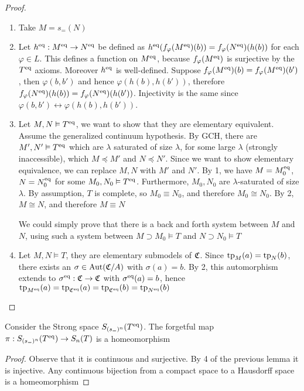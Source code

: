 \documentclass[11pt]{article}
\begin{document}
\begin{proof}
\begin{enumerate}
\item Take \(M=s_=(N)\)
\item Let \(h^{\operatorname{eq}}:M^{\operatorname{eq}}\to N^{\operatorname{eq}}\) be defined
as \(h^{\operatorname{eq}}(f_\varphi(M^{\operatorname{eq}})(b))=f_\varphi(N^{\operatorname{eq}})(h(b))\) for each \(\varphi\in L\). This defines a function
on \(M^{\operatorname{eq}}\), because \(f_\varphi(M^{\operatorname{eq}})\) is surjective by the \(T^{\operatorname{eq}}\) axioms.
Moreover \(h^{\operatorname{eq}}\) is well-defined. Suppose \(f_\varphi(M^{\operatorname{eq}})(b)=f_\varphi(M^{\operatorname{eq}})(b')\),
then \(\varphi(b,b')\) and hence \(\varphi(h(b),h(b'))\),
therefore \(f_\varphi(N^{\operatorname{eq}})(h(b))=f_\varphi(N^{\operatorname{eq}})(h(b'))\). Injectivity is the same
since \(\varphi(b,b')\leftrightarrow\varphi(h(b),h(b'))\).
\item Let \(M,N\vDash T^{\operatorname{eq}}\), we want to show that they are elementary equivalent. Assume the
generalized continuum hypothesis. By GCH, there are \(M',N'\vDash T^{\operatorname{eq}}\) which are \(\lambda\) saturated
of size \(\lambda\), for some large \(\lambda\) (strongly inaccessible), which \(M\preceq M'\) and \(N\preceq N'\). Since we
want to show elementary equivalence, we can replace \(M,N\) with \(M'\) and \(N'\). By 1, we
have \(M=M_0^{\operatorname{eq}}\), \(N=N_0^{\operatorname{eq}}\) for some \(M_0,N_0\vDash T^{\operatorname{eq}}\). Furthermore, \(M_0,N_0\)
are \(\lambda\)-saturated of size \(\lambda\). By assumption, \(T\) is complete, so \(M_0\equiv N_0\), and
therefore \(M_0\cong N_0\). By 2, \(M\cong N\), and therefore \(M\equiv N\)

We could simply prove that there is a back and forth system between \(M\) and \(N\), using
such a system between \(M\supset M_0\vDash T\) and \(N\supset N_0\vDash T\)
\label{Problem13}
\item Let \(M,N\vDash T\), they are elementary submodels of \(\mathfrak{C}\). Since \(\operatorname{tp}_M(a)=\operatorname{tp}_N(b)\), there
exists an \(\sigma\in\operatorname{\text{Aut}}(\mathfrak{C}/A)\) with \(\sigma(a)=b\). By 2, this automorphism extends to \(\sigma^{\operatorname{eq}}:\mathfrak{C}\to\mathfrak{C}\)
with \(\sigma^{\operatorname{eq}}(a)=b\), hence \(\operatorname{tp}_{M^{\operatorname{eq}}}(a)=\operatorname{tp}_{\mathfrak{C}^{\operatorname{eq}}}(a)=\operatorname{tp}_{\mathfrak{C}^{\operatorname{eq}}}(b)=\operatorname{tp}_{N^{\operatorname{eq}}}(b)\)
\end{enumerate}
\end{proof}

\begin{corollary}[]
Consider the Strong space \(S_{(s_=)^n}(T^{\operatorname{eq}})\). The forgetful
map \(\pi:S_{(s_=)^n}(T^{\operatorname{eq}})\to S_n(T)\) is a homeomorphism
\end{corollary}

\begin{proof}
Observe that it is continuous and surjective. By 4 of the previous lemma it is injective. Any
continuous bijection from a compact space to a Hausdorff space is a homeomorphism
\end{proof}
\end{document}
